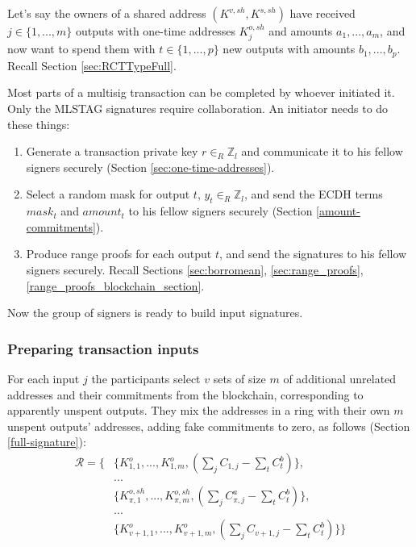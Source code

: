 Let's say the owners of a shared address $(K^{v,sh},K^{s,sh})$ have received $j \in \{1,...,m\}$ outputs with one-time addresses $K^{o,sh}_j$ and amounts $a_1,...,a_m$, and now want to spend them with $t \in \{1,...,p\}$ new outputs with amounts $b_1,...,b_p$. Recall Section \ref{sec:RCTTypeFull}.

Most parts of a multisig transaction can be completed by whoever initiated it. Only the MLSTAG signatures require collaboration. An initiator needs to do these things:

\begin{enumerate}
    \item Generate a transaction private key $r \in_R \mathbb{Z}_l$ and communicate it to his fellow signers securely (Section \ref{sec:one-time-addresses}).
    \item Select a random mask for output $t$, $y_{t} \in_R \mathbb{Z}_l$, and send the ECDH terms $\mathit{mask}_t$ and $\mathit{amount}_t$ to his fellow signers securely (Section \ref{amount-commitments}).
    \item Produce range proofs for each output $t$, and send the signatures to his fellow signers securely. Recall Sections \ref{sec:borromean}, \ref{sec:range_proofs}, \ref{range_proofs_blockchain_section}.%
\end{enumerate}

Now the group of signers is ready to build input signatures.

\subsubsection*{Preparing transaction inputs}

For each input $j$ the participants select $v$ sets of size $m$ of additional unrelated addresses and their commitments from the blockchain, corresponding to apparently unspent outputs.  They mix the addresses in a ring with their own $m$ unspent outputs' addresses, adding fake commitments to zero, as follows (Section \ref{full-signature}):
\begin{align*}
  \mathcal{R} = \{ &\{K_{1,1}^o,...,K_{1,m}^o, (\sum\limits_j C_{1, j} - \sum\limits_t C^b_{t})\}, \\
  &... \\
  &\{K^{o,sh}_{\pi,1},...,K^{o,sh}_{\pi,m}, (\sum\limits_j C^a_{\pi, j} - \sum\limits_t C^b_{t})\}, \\
  &... \\
  &\{K_{v+1,1}^o,...,K_{v+1,m}^o, (\sum\limits_j C_{v+1, j} - \sum\limits_t C^b_{t})\}\}
\end{align*}

